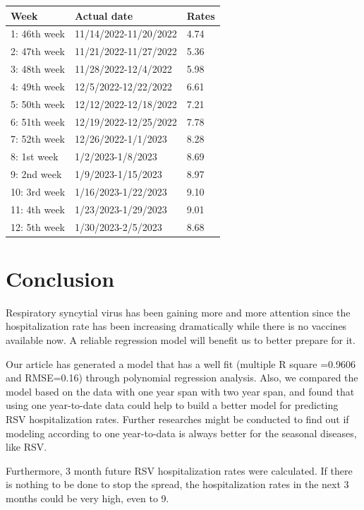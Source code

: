 \documentclass[
  letterpaper,
  DIV=11,
  numbers=noendperiod]{scrreport}
\begin{document}
\begin{longtable}[]{@{}lll@{}}
\toprule()
Week & Actual date & Rates \\
\midrule()
\endhead
1: 46th week & 11/14/2022-11/20/2022 & 4.74 \\
2: 47th week & 11/21/2022-11/27/2022 & 5.36 \\
3: 48th week & 11/28/2022-12/4/2022 & 5.98 \\
4: 49th week & 12/5/2022-12/22/2022 & 6.61 \\
5: 50th week & 12/12/2022-12/18/2022 & 7.21 \\
6: 51th week & 12/19/2022-12/25/2022 & 7.78 \\
7: 52th week & 12/26/2022-1/1/2023 & 8.28 \\
8: 1st week & 1/2/2023-1/8/2023 & 8.69 \\
9: 2nd week & 1/9/2023-1/15/2023 & 8.97 \\
10: 3rd week & 1/16/2023-1/22/2023 & 9.10 \\
11: 4th week & 1/23/2023-1/29/2023 & 9.01 \\
12: 5th week & 1/30/2023-2/5/2023 & 8.68 \\
\bottomrule()
\end{longtable}


\hypertarget{conclusion}{%
\chapter{Conclusion}\label{conclusion}}

Respiratory syncytial virus has been gaining more and more attention
since the hospitalization rate has been increasing dramatically while
there is no vaccines available now. A reliable regression model will
benefit us to better prepare for it.

Our article has generated a model that has a well fit (multiple R square
=0.9606 and RMSE=0.16) through polynomial regression analysis. Also, we
compared the model based on the data with one year span with two year
span, and found that using one year-to-date data could help to build a
better model for predicting RSV hospitalization rates. Further
researches might be conducted to find out if modeling according to one
year-to-data is always better for the seasonal diseases, like RSV.

Furthermore, 3 month future RSV hospitalization rates were calculated.
If there is nothing to be done to stop the spread, the hospitalization
rates in the next 3 months could be very high, even to 9.
\end{document}
